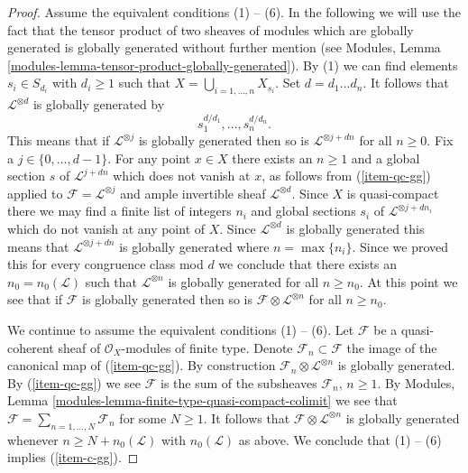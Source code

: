 \begin{proof}
\medskip\noindent
Assume the equivalent conditions (1) -- (6). In the following
we will use the fact that the tensor product of two sheaves of
modules which are globally generated is globally generated without
further mention (see
Modules, Lemma \ref{modules-lemma-tensor-product-globally-generated}).
By (1) we can find elements $s_i \in S_{d_i}$ with $d_i \geq 1$
such that $X = \bigcup_{i = 1, \ldots, n} X_{s_i}$.
Set $d = d_1\ldots d_n$. It follows that $\mathcal{L}^{\otimes d}$
is globally generated by
$$
s_1^{d/d_1}, \ldots, s_n^{d/d_n}.
$$
This means that if $\mathcal{L}^{\otimes j}$ is globally generated
then so is $\mathcal{L}^{\otimes j + dn}$ for all $n \geq 0$.
Fix a $j \in \{0, \ldots, d - 1\}$. For any point $x \in X$ there
exists an $n \geq 1$ and a global section $s$ of $\mathcal{L}^{j + dn}$
which does not vanish at $x$, as follows from (\ref{item-qc-gg}) applied
to $\mathcal{F} = \mathcal{L}^{\otimes j}$ and ample invertible
sheaf $\mathcal{L}^{\otimes d}$. Since $X$ is quasi-compact there
we may find a finite list of integers $n_i$ and global sections
$s_i$ of $\mathcal{L}^{\otimes j + dn_i}$ which do not vanish at any point
of $X$. Since $\mathcal{L}^{\otimes d}$ is globally generated this means that
$\mathcal{L}^{\otimes j + dn}$ is globally generated where $n = \max\{n_i\}$.
Since we proved this for every congruence class mod $d$ we
conclude that there exists an $n_0 = n_0(\mathcal{L})$ such that
$\mathcal{L}^{\otimes n}$ is globally generated for all $n \geq n_0$.
At this point we see that if $\mathcal{F}$ is globally generated then
so is $\mathcal{F} \otimes \mathcal{L}^{\otimes n}$ for all
$n \geq n_0$.

\medskip\noindent
We continue to assume the equivalent conditions (1) -- (6).
Let $\mathcal{F}$ be a quasi-coherent
sheaf of $\mathcal{O}_X$-modules of finite type.
Denote $\mathcal{F}_n \subset \mathcal{F}$ the image of the canonical
map of (\ref{item-qc-gg}). By construction
$\mathcal{F}_n \otimes \mathcal{L}^{\otimes n}$ is
globally generated. By (\ref{item-qc-gg}) we see
$\mathcal{F}$ is the sum of the subsheaves $\mathcal{F}_n$,
$n \geq 1$. By
Modules, Lemma \ref{modules-lemma-finite-type-quasi-compact-colimit}
we see that $\mathcal{F} = \sum_{n = 1, \ldots, N} \mathcal{F}_n$
for some $N \geq 1$. It follows that
$\mathcal{F} \otimes \mathcal{L}^{\otimes n}$ is globally
generated whenever $n \geq N + n_0(\mathcal{L})$ with $n_0(\mathcal{L})$
as above. We conclude that (1) -- (6) implies (\ref{item-c-gg}).


\end{proof}

